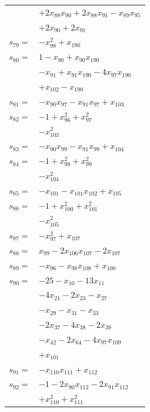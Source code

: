 \begin{longtable}{@{}r@{\;}l@{}}
 & \(\displaystyle +2x_{88}x_{90} +2x_{88}x_{91} -x_{89}x_{95}\) \\
 & \(\displaystyle +2x_{90} +2x_{91}\) \\[3pt]
\(s_{79}=\) & \(\displaystyle -x_{98}^{2} +x_{190}\) \\[3pt]
\(s_{80}=\) & \(\displaystyle 1 -x_{90} +x_{90}x_{190}\) \\
 & \(\displaystyle -x_{91} +x_{91}x_{190} -4x_{97}x_{190}\) \\
 & \(\displaystyle +x_{102} -x_{190}\) \\[3pt]
\(s_{81}=\) & \(\displaystyle -x_{90}x_{97} -x_{91}x_{97} +x_{103}\) \\[3pt]
\(s_{82}=\) & \(\displaystyle -1 +x_{96}^{2} +x_{97}^{2}\) \\
 & \(\displaystyle -x_{103}^{2}\) \\[3pt]
\(s_{83}=\) & \(\displaystyle -x_{90}x_{99} -x_{91}x_{99} +x_{104}\) \\[3pt]
\(s_{84}=\) & \(\displaystyle -1 +x_{98}^{2} +x_{99}^{2}\) \\
 & \(\displaystyle -x_{104}^{2}\) \\[3pt]
\(s_{85}=\) & \(\displaystyle -x_{101} -x_{101}x_{102} +x_{105}\) \\[3pt]
\(s_{86}=\) & \(\displaystyle -1 +x_{100}^{2} +x_{101}^{2}\) \\
 & \(\displaystyle -x_{105}^{2}\) \\[3pt]
\(s_{87}=\) & \(\displaystyle -x_{97}^{2} +x_{107}\) \\[3pt]
\(s_{88}=\) & \(\displaystyle x_{99} -2x_{106}x_{107} -2x_{107}\) \\[3pt]
\(s_{89}=\) & \(\displaystyle -x_{96} -x_{98}x_{108} +x_{100}\) \\[3pt]
\(s_{90}=\) & \(\displaystyle -25 -x_{10} -13x_{11}\) \\
 & \(\displaystyle -4x_{21} -2x_{23} -x_{27}\) \\
 & \(\displaystyle -x_{29} -x_{31} -x_{33}\) \\
 & \(\displaystyle -2x_{37} -4x_{38} -2x_{39}\) \\
 & \(\displaystyle -x_{42} -2x_{64} -4x_{97}x_{109}\) \\
 & \(\displaystyle +x_{101}\) \\[3pt]
\(s_{91}=\) & \(\displaystyle -x_{110}x_{111} +x_{112}\) \\[3pt]
\(s_{92}=\) & \(\displaystyle -1 -2x_{90}x_{112} -2x_{91}x_{112}\) \\
 & \(\displaystyle +x_{110}^{2} +x_{111}^{2}\) \\[3pt]

\end{longtable}
